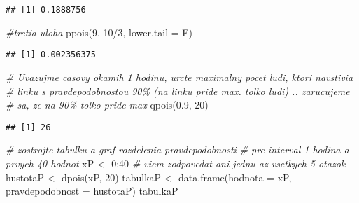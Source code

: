 \documentclass[
]{article}
\newenvironment{Shaded}{\begin{snugshade}}{\end{snugshade}}
\newcommand{\AttributeTok}[1]{\textcolor[rgb]{0.77,0.63,0.00}{#1}}
\newcommand{\CommentTok}[1]{\textcolor[rgb]{0.56,0.35,0.01}{\textit{#1}}}
\newcommand{\DecValTok}[1]{\textcolor[rgb]{0.00,0.00,0.81}{#1}}
\newcommand{\FloatTok}[1]{\textcolor[rgb]{0.00,0.00,0.81}{#1}}
\newcommand{\FunctionTok}[1]{\textcolor[rgb]{0.00,0.00,0.00}{#1}}
\newcommand{\NormalTok}[1]{#1}
\newcommand{\OtherTok}[1]{\textcolor[rgb]{0.56,0.35,0.01}{#1}}
\newcommand{\SpecialCharTok}[1]{\textcolor[rgb]{0.00,0.00,0.00}{#1}}
\begin{document}
\begin{verbatim}
## [1] 0.1888756
\end{verbatim}

\begin{Shaded}
\begin{Highlighting}[]
\CommentTok{\#tretia uloha}
\FunctionTok{ppois}\NormalTok{(}\DecValTok{9}\NormalTok{, }\DecValTok{10}\SpecialCharTok{/}\DecValTok{3}\NormalTok{, }\AttributeTok{lower.tail =}\NormalTok{ F)}
\end{Highlighting}
\end{Shaded}

\begin{verbatim}
## [1] 0.002356375
\end{verbatim}

\begin{Shaded}
\begin{Highlighting}[]
\CommentTok{\# Uvazujme casovy okamih 1 hodinu, urcte maximalny pocet ludi, ktori navstivia}
\CommentTok{\# linku s pravdepodobnostou 90\% (na linku pride max. tolko ludi) .. zarucujeme }
\CommentTok{\# sa, ze na 90\% tolko pride max}
\FunctionTok{qpois}\NormalTok{(}\FloatTok{0.9}\NormalTok{, }\DecValTok{20}\NormalTok{)}
\end{Highlighting}
\end{Shaded}

\begin{verbatim}
## [1] 26
\end{verbatim}

\begin{Shaded}
\begin{Highlighting}[]
\CommentTok{\# zostrojte tabulku a graf rozdelenia pravdepodobnosti}
\CommentTok{\# pre interval 1 hodina a prvych 40 hodnot}
\NormalTok{xP }\OtherTok{\textless{}{-}} \DecValTok{0}\SpecialCharTok{:}\DecValTok{40} \CommentTok{\# viem zodpovedat ani jednu az vsetkych 5 otazok}
\NormalTok{hustotaP }\OtherTok{\textless{}{-}} \FunctionTok{dpois}\NormalTok{(xP, }\DecValTok{20}\NormalTok{)}
\NormalTok{tabulkaP }\OtherTok{\textless{}{-}} \FunctionTok{data.frame}\NormalTok{(}\AttributeTok{hodnota =}\NormalTok{ xP, }\AttributeTok{pravdepodobnost =}\NormalTok{ hustotaP)}
\NormalTok{tabulkaP}
\end{Highlighting}
\end{Shaded}
\end{document}

